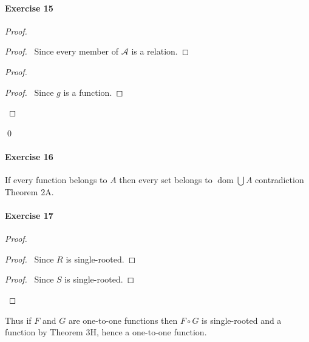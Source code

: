 \documentclass{report}
\newcommand{\dom}{\ensuremath{\operatorname{dom}}}
\begin{document}
    \paragraph{Exercise 15}
    \begin{proof}
        \pf
        \begin{proof}
            \pf\ Since every member of $\mathcal{A}$ is a relation.
        \end{proof}
        \begin{proof}
            \begin{proof}
                \pf\ Since $g$ is a function.
            \end{proof}
        \end{proof}
        \qed
    \end{proof}

    \paragraph{Exercise 16}
    If every function belongs to $A$ then every set belongs to $\dom \bigcup A$ contradiction Theorem 2A.

    \paragraph{Exercise 17}
    \begin{proof}
        \pf
        \begin{proof}
            \pf\ Since $R$ is single-rooted.
        \end{proof}
        \begin{proof}
            \pf\ Since $S$ is single-rooted.
        \end{proof}
    \end{proof}

    Thus if $F$ and $G$ are one-to-one functions then $F \circ G$ is single-rooted and a function by Theorem
    3H, hence a one-to-one function.
    
\end{document}
